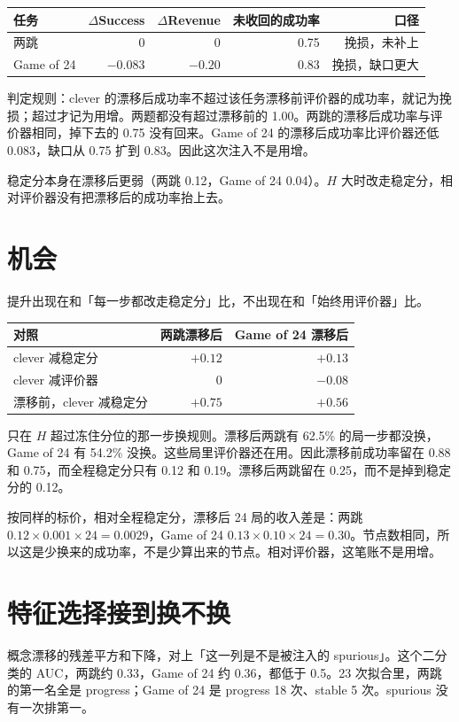 \documentclass[UTF8,a4paper]{ctexart}
\begin{document}
\begin{center}
\begin{tabular}{lrrrr}
\toprule
任务 & \(\Delta\)Success & \(\Delta\)Revenue & 未收回的成功率 & 口径 \\
\midrule
两跳 & 0 & 0 & 0.75 & 挽损，未补上 \\
Game of 24 & \(-0.083\) & \(-0.20\) & 0.83 & 挽损，缺口更大 \\
\bottomrule
\end{tabular}
\end{center}

判定规则：clever 的漂移后成功率不超过该任务漂移前评价器的成功率，就记为挽损；超过才记为用增。两题都没有超过漂移前的 1.00。两跳的漂移后成功率与评价器相同，掉下去的 0.75 没有回来。Game of 24 的漂移后成功率比评价器还低 0.083，缺口从 0.75 扩到 0.83。因此这次注入不是用增。

稳定分本身在漂移后更弱（两跳 0.12，Game of 24 0.04）。\(H\) 大时改走稳定分，相对评价器没有把漂移后的成功率抬上去。

\section{机会}
提升出现在和「每一步都改走稳定分」比，不出现在和「始终用评价器」比。

\begin{center}
\begin{tabular}{lrr}
\toprule
对照 & 两跳漂移后 & Game of 24 漂移后 \\
\midrule
clever 减稳定分 & \(+0.12\) & \(+0.13\) \\
clever 减评价器 & \(0\) & \(-0.08\) \\
漂移前，clever 减稳定分 & \(+0.75\) & \(+0.56\) \\
\bottomrule
\end{tabular}
\end{center}

只在 \(H\) 超过冻住分位的那一步换规则。漂移后两跳有 62.5\% 的局一步都没换，Game of 24 有 54.2\% 没换。这些局里评价器还在用。因此漂移前成功率留在 0.88 和 0.75，而全程稳定分只有 0.12 和 0.19。漂移后两跳留在 0.25，而不是掉到稳定分的 0.12。

按同样的标价，相对全程稳定分，漂移后 24 局的收入差是：两跳 \(0.12\times 0.001\times 24=0.0029\)，Game of 24 \(0.13\times 0.10\times 24=0.30\)。节点数相同，所以这是少换来的成功率，不是少算出来的节点。相对评价器，这笔账不是用增。

\section{特征选择接到换不换}
概念漂移的残差平方和下降，对上「这一列是不是被注入的 spurious」。这个二分类的 AUC，两跳约 0.33，Game of 24 约 0.36，都低于 0.5。23 次拟合里，两跳的第一名全是 progress；Game of 24 是 progress 18 次、stable 5 次。spurious 没有一次排第一。
\end{document}
